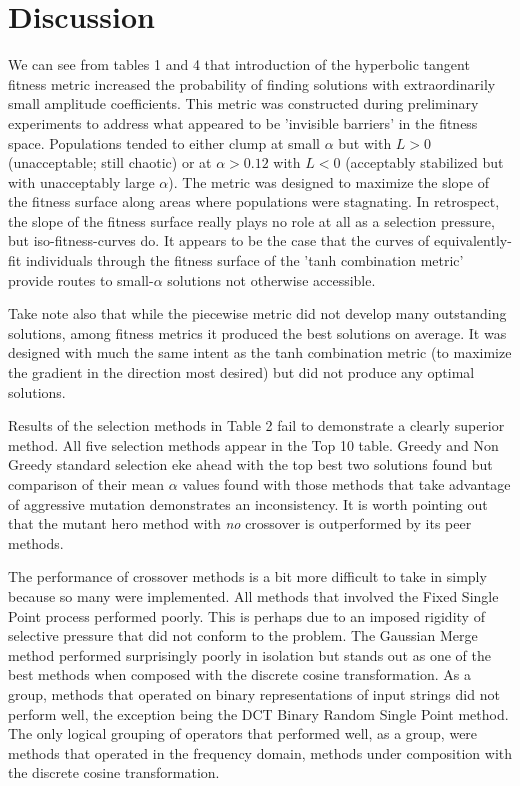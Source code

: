\documentclass[12pt]{article}
\begin{document}
\section{Discussion}
We can see from tables 1 and 4 that introduction of the hyperbolic tangent
fitness metric increased the probability of finding solutions with
extraordinarily small amplitude coefficients.  This metric was constructed
during preliminary experiments to address what appeared to be 'invisible
barriers' in the fitness space.  Populations tended to either clump at
small $\alpha$ but with $L > 0$ (unacceptable; still chaotic) or at
$\alpha > 0.12$ with $L < 0$ (acceptably stabilized but with unacceptably large
$\alpha$).  The metric was designed to maximize the slope of the fitness
surface along areas where populations were stagnating.  In retrospect, the
slope of the fitness surface really plays no role at all as a selection
pressure, but iso-fitness-curves do.  It appears to be the case that the
curves of equivalently-fit individuals through the fitness surface of the
'tanh combination metric' provide routes to small-$\alpha$ solutions not
otherwise accessible.

Take note also that while the piecewise metric did not develop many outstanding solutions, among fitness metrics it produced the best solutions on average.  It was
designed with much the same intent as the tanh combination metric (to maximize
the gradient in the direction most desired) but did not produce any optimal
solutions.

Results of the selection methods in Table 2 fail to demonstrate a clearly
superior method.  All five selection methods appear in the Top 10 table.
Greedy and Non Greedy standard selection eke ahead with the top best two
solutions found but comparison of their mean $\alpha$ values found with those
methods that take advantage of aggressive mutation demonstrates an inconsistency.  It is worth pointing out that the mutant hero method with \textit{no} crossover is outperformed by its peer methods.

The performance of crossover methods is a bit more difficult to take in simply
because so many were implemented.  All methods that involved the Fixed Single Point process performed poorly.  This is perhaps due to an imposed rigidity of
selective pressure that did not conform to the problem.  The Gaussian Merge method performed surprisingly poorly in isolation but stands out as one of the best methods when composed with the discrete cosine transformation.  As a group, methods that operated on binary representations of input strings did not perform well, the exception being the DCT Binary Random Single Point method.  The only logical grouping of operators that performed well, as a group, were methods that operated in the frequency domain, methods under composition with the discrete cosine transformation.
\end{document}
